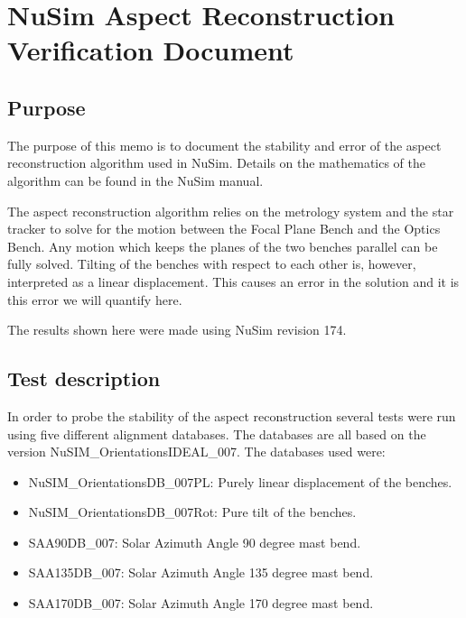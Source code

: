 



%

\chapter{NuSim Aspect Reconstruction Verification Document}
\section{Purpose}
The purpose of this memo is to document the stability and error of the aspect reconstruction algorithm used in NuSim. Details on the mathematics of the algorithm can be found in the NuSim manual. 

The aspect reconstruction algorithm relies on the metrology system and the star tracker to solve for the motion between the Focal Plane Bench and the Optics Bench. Any motion which keeps the planes of the two benches parallel can be fully solved. Tilting of the benches with respect to each other is, however, interpreted as a linear displacement. This causes an error in the solution and it is this error we will quantify here. 

The results shown here were made using NuSim revision 174.

\section{Test description}
In order to probe the stability of the aspect reconstruction several tests were run using five different alignment databases. The databases are all based on the version NuSIM\_OrientationsIDEAL\_007. The databases used were: 

\begin{itemize}
\item NuSIM\_OrientationsDB\_007PL: Purely linear displacement of the benches.
\item NuSIM\_OrientationsDB\_007Rot: Pure tilt of the benches.
\item SAA90DB\_007: Solar Azimuth Angle 90 degree mast bend.
\item SAA135DB\_007: Solar Azimuth Angle 135 degree mast bend.
\item SAA170DB\_007: Solar Azimuth Angle 170 degree mast bend.
\end{itemize}

